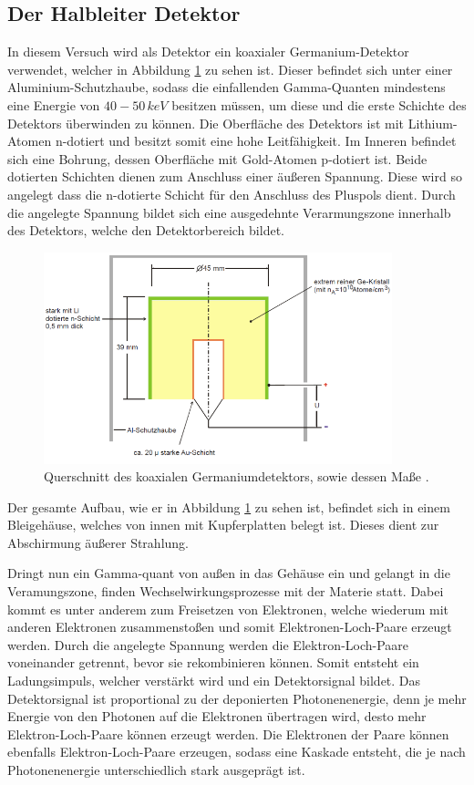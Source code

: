\subsection{Der Halbleiter Detektor}
In diesem Versuch wird als Detektor ein koaxialer Germanium-Detektor verwendet, welcher in Abbildung \ref{fig:tfig7} zu sehen ist.
Dieser befindet sich unter einer Aluminium-Schutzhaube, sodass die einfallenden Gamma-Quanten mindestens eine Energie von $40-50\,\si{keV}$ besitzen müssen, um diese und die erste Schichte des Detektors überwinden zu können.
Die Oberfläche des Detektors ist mit Lithium-Atomen n-dotiert und besitzt somit eine hohe Leitfähigkeit.
Im Inneren befindet sich eine Bohrung, dessen Oberfläche mit Gold-Atomen p-dotiert ist.
Beide dotierten Schichten dienen zum Anschluss einer äußeren Spannung.
Diese wird so angelegt dass die n-dotierte Schicht für den Anschluss des Pluspols dient.
Durch die angelegte Spannung bildet sich eine ausgedehnte Verarmungszone innerhalb des Detektors, welche den Detektorbereich bildet.

\FloatBarrier
\begin{figure}
\centering
\includegraphics[width = 0.9\textwidth]{Detektor.png}
\caption{Querschnitt des koaxialen Germaniumdetektors, sowie dessen Maße \cite{quelle01}.}
\label{fig:tfig7}
\end{figure}
\FloatBarrier

Der gesamte Aufbau, wie er in Abbildung \ref{fig:tfig7} zu sehen ist, befindet sich in einem Bleigehäuse, welches von innen mit Kupferplatten belegt ist.
Dieses dient zur Abschirmung äußerer Strahlung.

Dringt nun ein Gamma-quant von außen in das Gehäuse ein und gelangt in die Veramungszone, finden Wechselwirkungsprozesse mit der Materie statt.
Dabei kommt es unter anderem zum Freisetzen von Elektronen, welche wiederum mit anderen Elektronen zusammenstoßen und somit Elektronen-Loch-Paare erzeugt werden.
Durch die angelegte Spannung werden die Elektron-Loch-Paare voneinander getrennt, bevor sie rekombinieren können.
Somit entsteht ein Ladungsimpuls, welcher verstärkt wird und ein Detektorsignal bildet.
Das Detektorsignal ist proportional zu der deponierten Photonenenergie, denn je mehr Energie von den Photonen auf die Elektronen übertragen wird, desto mehr Elektron-Loch-Paare können erzeugt werden.
Die Elektronen der Paare können ebenfalls Elektron-Loch-Paare erzeugen, sodass eine Kaskade entsteht, die je nach Photonenenergie unterschiedlich stark ausgeprägt ist.

